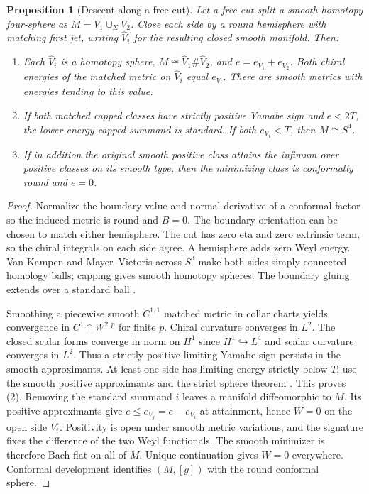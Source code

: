 \documentclass[11pt,letterpaper]{article}
\numberwithin{equation}{section}
\newtheorem{proposition}[theorem]{Proposition}
\theoremstyle{definition}
\begin{document}
\begin{proposition}[Descent along a free cut]\label{prop:free}
Let a free cut split a smooth homotopy four-sphere as
\(M=V_1\cup_\Sigma V_2\). Close each side by a round hemisphere with
matching first jet, writing \(\widehat V_i\) for the resulting closed
smooth manifold. Then:
\begin{enumerate}
\item Each \(\widehat V_i\) is a homotopy sphere,
\(M\cong\widehat V_1\#\widehat V_2\), and \(e=e_{V_1}+e_{V_2}\).
Both chiral energies of the matched metric on \(\widehat V_i\) equal
\(e_{V_i}\). There are smooth metrics with energies tending to this value.
\item If both matched capped classes have strictly positive Yamabe sign
and \(e<2T\), the lower-energy capped summand is standard. If both
\(e_{V_i}<T\), then \(M\cong S^4\).
\item If in addition the original smooth positive class attains the
infimum over positive classes on its smooth type, then the minimizing class is conformally round and \(e=0\).
\end{enumerate}
\end{proposition}
\begin{proof}
Normalize the boundary value and normal derivative of a conformal
factor so the induced metric is round and \(B=0\). The boundary
orientation can be chosen to match either hemisphere. The cut has
zero eta and zero extrinsic term, so the chiral integrals on each
side agree. A hemisphere adds zero Weyl energy. Van Kampen and
Mayer--Vietoris across \(S^3\) make both sides simply connected
homology balls; capping gives smooth homotopy spheres. The boundary
gluing extends over a standard ball \cite{Cerf1968Gamma4}.

Smoothing a piecewise smooth \(C^{1,1}\) matched metric in collar
charts yields convergence in \(C^1\cap W^{2,p}\) for finite \(p\).
Chiral curvature converges in \(L^2\). The closed scalar forms converge
in norm on \(H^1\) since \(H^1\hookrightarrow L^4\) and scalar curvature
converges in \(L^2\). Thus a strictly positive limiting Yamabe sign
persists in the smooth approximants. At least one side has limiting
energy strictly below \(T\); use the smooth positive approximants and
the strict sphere theorem \cite{ChangGurskyYang2003}. This proves (2).
Removing the standard summand \(i\) leaves a
manifold diffeomorphic to \(M\). Its positive approximants give
\(e\le e_{V_j}=e-e_{V_i}\) at attainment, hence \(W=0\) on the open
side \(V_i^\circ\). Positivity is open under smooth metric variations,
and the signature fixes the difference of the two Weyl functionals.
The smooth minimizer is therefore Bach-flat on all of \(M\).
Unique continuation \cite[Theorem 3.8]{LassasLiimatainen2019ConformalHarmonic}
gives \(W=0\) everywhere. Conformal development identifies \((M,[g])\) with the round conformal sphere.
\end{proof}
\end{document}
